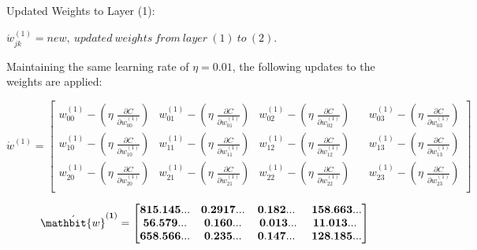 \documentclass[12pt,a4paper]{article}
\begin{document}
\begin{mybox1}{Updated Weights to Layer (1):}


${\acute{w}}_{jk}^{\left(1\right)}=new,\ updated\ weights\ from\ layer\ \left(1\right)\ to\ \left(2\right).$

Maintaining the same learning rate of \textbf{$\eta = 0.01$}, the following updates to the weights are applied:

\begin{equation}
{\acute{w}}^{\left(1\right)}=\left[\begin{matrix}w_{00}^{\left(1\right)}-\left(\eta\frac{\partial C}{\partial w_{00}^{\left(1\right)}}\right)&w_{01}^{\left(1\right)}-\left(\eta\frac{\partial C}{\partial w_{01}^{\left(1\right)}}\right)&w_{02}^{\left(1\right)}-\left(\eta\frac{\partial C}{\partial w_{02}^{\left(1\right)}}\right)\\w_{10}^{\left(1\right)}-\left(\eta\frac{\partial C}{\partial w_{10}^{\left(1\right)}}\right)&w_{11}^{\left(1\right)}-\left(\eta\frac{\partial C}{\partial w_{11}^{\left(1\right)}}\right)&w_{12}^{\left(1\right)}-\left(\eta\frac{\partial C}{\partial w_{12}^{\left(1\right)}}\right)\\w_{20}^{\left(1\right)}-\left(\eta\frac{\partial C}{\partial w_{20}^{\left(1\right)}}\right)&w_{21}^{\left(1\right)}-\left(\eta\frac{\partial C}{\partial w_{21}^{\left(1\right)}}\right)&w_{22}^{\left(1\right)}-\left(\eta\frac{\partial C}{\partial w_{22}^{\left(1\right)}}\right)\\\end{matrix}\ \ \ \ \begin{matrix}w_{03}^{\left(1\right)}-\left(\eta\frac{\partial C}{\partial w_{03}^{\left(1\right)}}\right)\\w_{13}^{\left(1\right)}-\left(\eta\frac{\partial C}{\partial w_{13}^{\left(1\right)}}\right)\\w_{23}^{\left(1\right)}-\left(\eta\frac{\partial C}{\partial w_{23}^{\left(1\right)}}\right)\\\end{matrix}\right]
\end{equation}

\begin{equation}
{\acute{\mathbit{w}}}^{\left(\mathbf{1}\right)}=\left[\begin{matrix}\mathbf{815}.\mathbf{145}...&\mathbf{0}.\mathbf{2917}...&\mathbf{0}.\mathbf{182}...\\\mathbf{56}.\mathbf{579}...&\mathbf{0}.\mathbf{160}...&\ \mathbf{0}.\mathbf{013}...\\\mathbf{658}.\mathbf{566}...&\mathbf{0}.\mathbf{235}...&\mathbf{0}.\mathbf{147}...\\\end{matrix}\ \ \ \ \begin{matrix}\mathbf{158}.\mathbf{663}...\\\mathbf{11}.\mathbf{013}...\ \\\mathbf{128}.\mathbf{185}...\\\end{matrix}\right]
\end{equation}

\end{mybox1}
\end{document}
